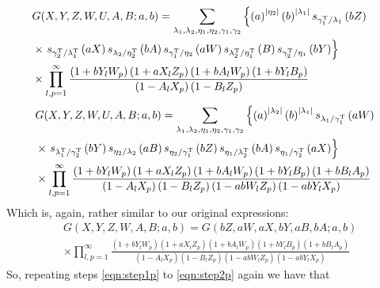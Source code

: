 \documentclass[main.tex]{subfiles}
\begin{document}
\begin{equation}
\begin{aligned}
&G(X,Y,Z,W,U,A,B;a,b)=\sum_{\lambda_1,\lambda_2,\eta_1,\eta_2,\gamma_1,\gamma_2}\left\{\left(a\right)^{|\eta_2|}\left(b\right)^{|\lambda_1|}s_{\gamma_1^{\operatorname{T}}/\lambda_1}\left(bZ\right)\right.\\
&\times\left.s_{\gamma_2^{\operatorname{T}}/\lambda_1^{\operatorname{T}}}\left(aX\right)s_{\lambda_2/\eta_2^{\operatorname{T}}}\left(bA\right)s_{\gamma_1^{\operatorname{T}}/\eta_2}\left(aW\right)s_{\lambda_2^{\operatorname{T}}/\eta_1^{\operatorname{T}}}\left(B\right)s_{\gamma_2^{\operatorname{T}}/\eta_1}\left(bY\right)\right\}&\\
&\times\prod_{l,p=1}^{\infty}\frac{\left(1+bY_lW_p\right)\left(1+aX_lZ_p\right)\left(1+bA_lW_p\right)\left(1+bY_lB_p\right)}{\left(1-A_lX_p\right)\left(1-B_lZ_p\right)}
\end{aligned}
\end{equation}
\begin{equation}\label{eqn:step2p}
\begin{aligned}
&G(X,Y,Z,W,U,A,B;a,b)=\sum_{\lambda_1,\lambda_2,\eta_1,\eta_2,\gamma_1,\gamma_2}\left\{\left(a\right)^{|\lambda_2|}\left(b\right)^{|\lambda_1|}s_{\lambda_1/\gamma_1^{\operatorname{T}}}\left(aW\right)\right.\\
&\times\left.s_{\lambda_1^{\operatorname{T}}/\gamma_2^{\operatorname{T}}}\left(bY\right)s_{\eta_2/\lambda_2}\left(aB\right)s_{\eta_2/\gamma_1^{\operatorname{T}}}\left(bZ\right)s_{\eta_1/\lambda_2^{\operatorname{T}}}\left(bA\right)s_{\eta_1/\gamma_2^{\operatorname{T}}}\left(aX\right)\right\}\\
&\times\prod_{l,p=1}^{\infty}\frac{\left(1+bY_lW_p\right)\left(1+aX_lZ_p\right)\left(1+bA_lW_p\right)\left(1+bY_lB_p\right)\left(1+bB_lA_p\right)}{\left(1-A_lX_p\right)\left(1-B_lZ_p\right)\left(1-abW_lZ_p\right)\left(1-abY_lX_p\right)}
\end{aligned}
\end{equation}
Which is, again, rather similar to our original expressions:
\begin{equation}
\begin{aligned}
&G(X,Y,Z,W,A,B;a,b)=G\left(bZ,aW,aX,bY,aB,bA;a,b\right)\\
&\times\prod_{l,p=1}^{\infty}\frac{\left(1+bY_lW_p\right)\left(1+aX_lZ_p\right)\left(1+bA_lW_p\right)\left(1+bY_lB_p\right)\left(1+bB_lA_p\right)}{\left(1-A_lX_p\right)\left(1-B_lZ_p\right)\left(1-abW_lZ_p\right)\left(1-abY_lX_p\right)}
\end{aligned}
\end{equation}
So, repeating steps \eqref{eqn:step1p} to \eqref{eqn:step2p} again we have that
\end{document}
